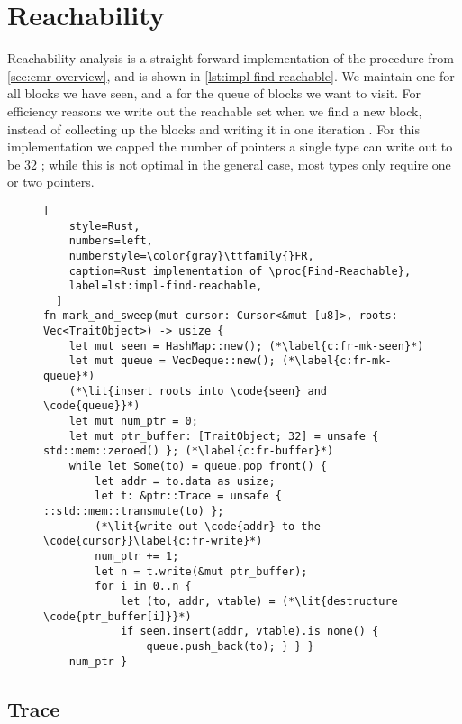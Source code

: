\section{Reachability}

Reachability analysis is a straight forward implementation of the  procedure
from \cref{sec:cmr-overview}, and is shown in \cref{lst:impl-find-reachable}. We maintain one
  for all blocks we have seen, and a 
 for the queue of blocks we want to visit. For efficiency reasons
we write out the reachable set when we find a new block, instead of collecting up the blocks and
writing it in one iteration .  For this implementation we capped the
number of pointers a single type can write out to be 32 ; while this
is not optimal in the general case, most types only require one or two pointers.



\begin{figure}[ht]
  \begin{lstlisting}[
    style=Rust,
    numbers=left,
    numberstyle=\color{gray}\ttfamily{}FR,
    caption=Rust implementation of \proc{Find-Reachable},
    label=lst:impl-find-reachable,
  ]
fn mark_and_sweep(mut cursor: Cursor<&mut [u8]>, roots: Vec<TraitObject>) -> usize {
    let mut seen = HashMap::new(); (*\label{c:fr-mk-seen}*)
    let mut queue = VecDeque::new(); (*\label{c:fr-mk-queue}*)
    (*\lit{insert roots into \code{seen} and \code{queue}}*)
    let mut num_ptr = 0;
    let mut ptr_buffer: [TraitObject; 32] = unsafe { std::mem::zeroed() }; (*\label{c:fr-buffer}*)
    while let Some(to) = queue.pop_front() {
        let addr = to.data as usize;
        let t: &ptr::Trace = unsafe { ::std::mem::transmute(to) };
        (*\lit{write out \code{addr} to the \code{cursor}}\label{c:fr-write}*)
        num_ptr += 1;
        let n = t.write(&mut ptr_buffer);
        for i in 0..n {
            let (to, addr, vtable) = (*\lit{destructure \code{ptr_buffer[i]}}*)
            if seen.insert(addr, vtable).is_none() {
                queue.push_back(to); } } }
    num_ptr }
\end{lstlisting}
\end{figure}


\subsection{Trace}

